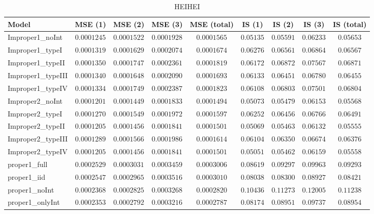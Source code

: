 \begin{table}

\caption{\label{tab:model-choice-sc11}HEIHEI}
\centering
\begin{tabular}{lcccccccc}
\hline
Model  & MSE (1) & MSE (2) & MSE (3) & MSE (total) & IS (1) & IS (2) & IS (3) & \multicolumn{1}{c}{IS (total)} \\ 
\hline
Improper1_noInt  & $0.0001245$ & $0.0001522$ & $0.0001928$ & $0.0001565$ & $0.05135$ & $0.05591$ & $0.06233$ & $0.05653$ \\
Improper1_typeI  & $0.0001319$ & $0.0001629$ & $0.0002074$ & $0.0001674$ & $0.06276$ & $0.06561$ & $0.06864$ & $0.06567$ \\
Improper1_typeII  & $0.0001350$ & $0.0001747$ & $0.0002361$ & $0.0001819$ & $0.06172$ & $0.06872$ & $0.07567$ & $0.06871$ \\
Improper1_typeIII  & $0.0001340$ & $0.0001648$ & $0.0002090$ & $0.0001693$ & $0.06133$ & $0.06451$ & $0.06780$ & $0.06455$ \\
Improper1_typeIV  & $0.0001334$ & $0.0001749$ & $0.0002387$ & $0.0001823$ & $0.06108$ & $0.06803$ & $0.07501$ & $0.06804$ \\
Improper2_noInt  & $0.0001201$ & $0.0001449$ & $0.0001833$ & $0.0001494$ & $0.05073$ & $0.05479$ & $0.06153$ & $0.05568$ \\
Improper2_typeI  & $0.0001270$ & $0.0001549$ & $0.0001972$ & $0.0001597$ & $0.06252$ & $0.06456$ & $0.06766$ & $0.06491$ \\
Improper2_typeII  & $0.0001205$ & $0.0001456$ & $0.0001841$ & $0.0001501$ & $0.05069$ & $0.05463$ & $0.06132$ & $0.05555$ \\
Improper2_typeIII  & $0.0001289$ & $0.0001566$ & $0.0001986$ & $0.0001614$ & $0.06104$ & $0.06350$ & $0.06674$ & $0.06376$ \\
Improper2_typeIV  & $0.0001205$ & $0.0001456$ & $0.0001841$ & $0.0001501$ & $0.05051$ & $0.05462$ & $0.06159$ & $0.05558$ \\
proper1_full  & $0.0002529$ & $0.0003031$ & $0.0003459$ & $0.0003006$ & $0.08619$ & $0.09297$ & $0.09963$ & $0.09293$ \\
proper1_iid  & $0.0002547$ & $0.0002965$ & $0.0003516$ & $0.0003010$ & $0.08038$ & $0.08300$ & $0.08927$ & $0.08421$ \\
proper1_noInt  & $0.0002368$ & $0.0002825$ & $0.0003268$ & $0.0002820$ & $0.10436$ & $0.11273$ & $0.12005$ & $0.11238$ \\
proper1_onlyInt  & $0.0002353$ & $0.0002792$ & $0.0003216$ & $0.0002787$ & $0.08174$ & $0.08951$ & $0.09737$ & $0.08954$ \\

\end{tabular}
\end{table}
